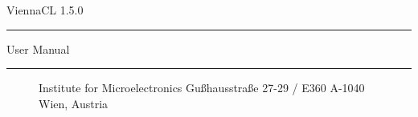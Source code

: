 
\begin{titlepage}

\vspace*{3cm}
\Huge{ViennaCL 1.5.0}
\rule[0.0cm]{9.5cm}{0.05cm}
\begin{flushright}
\Large{User Manual}
\end{flushright}

\vspace{13cm}
\rule[0.0cm]{16.0cm}{0.05cm}
\begin{figure}[!ht]
   \vspace{-1.0cm}
   \centering
   \begin{minipage}{3cm}
   \end{minipage}
   \hfill
   \hspace{-0.5cm}
   \begin{minipage}{5.5cm}
      \vspace{0.5cm}
      \begin{center}
      Institute for Microelectronics\newline
      Gu\ss hausstra\ss e 27-29 / E360\newline
      A-1040 Wien, Austria\newline
      \end{center}
   \end{minipage}
   \hfill
   \begin{minipage}{2.6cm}
   \end{minipage}
\end{figure}

\end{titlepage}


